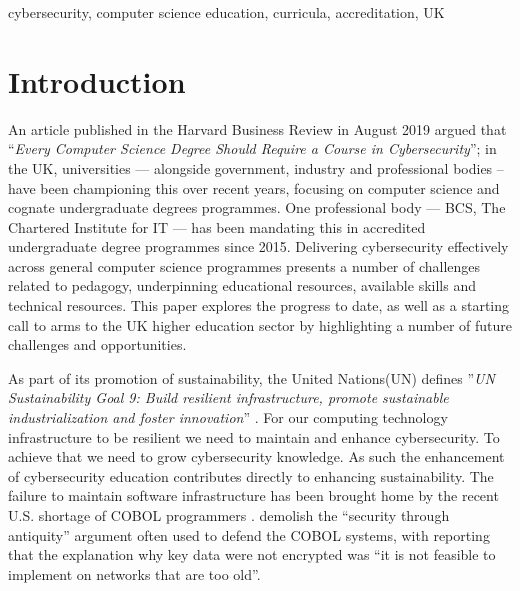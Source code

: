 \documentclass[conference]{IEEEtran}
\begin{document}
\begin{IEEEkeywords}
cybersecurity, computer science education, curricula, accreditation, UK
\end{IEEEkeywords}

\section{Introduction}\label{sec:intro}
An article published in the Harvard Business Review in August 2019 argued that ``{\emph{Every Computer Science Degree Should Require a Course in Cybersecurity}}''\cite{cable_2019}; in the UK, universities
--- alongside government, industry and professional bodies -- have been championing this over recent years, focusing on computer science and cognate undergraduate degrees programmes. One professional body --- BCS, The Chartered Institute for IT --- has been mandating this in accredited undergraduate degree programmes since 2015\cite{Cricketal2019}. Delivering cybersecurity effectively across general computer science programmes presents a number of challenges related to pedagogy, underpinning educational resources, available skills and technical resources. This paper explores the progress to date, as well as a starting call to arms to the UK higher education sector by highlighting a number of future challenges and opportunities.

As part of its promotion of sustainability, the United Nations(UN) defines ''{\em{UN Sustainability Goal 9: Build resilient infrastructure, promote sustainable industrialization and foster innovation}}'' \cite{UNgoal9}. For our computing technology infrastructure to be resilient we need to maintain and enhance cybersecurity. To achieve that we need to grow cybersecurity knowledge. As such the enhancement of cybersecurity education contributes directly to enhancing sustainability. The failure to maintain software infrastructure has been brought home by the recent U.S. shortage of COBOL programmers \cite{Shein2020e}.  \cite{PangTanriverdi2017a} demolish the ``security through antiquity'' argument often used to defend the COBOL systems, with \cite{Sternstein2015a} reporting that the explanation why key data were not encrypted was ``it is not feasible to implement on networks that are too old''.


\end{document}
